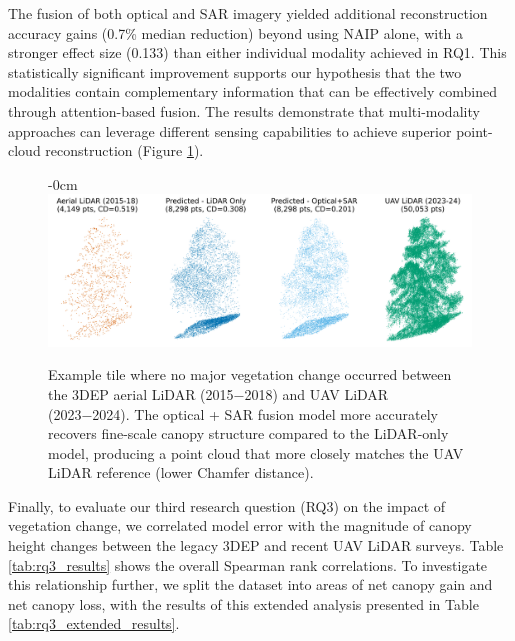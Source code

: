 \documentclass[remotesensing,article,accept,pdftex,moreauthors]{Definitions/mdpi}
\renewcommand{\hl}[1]{#1}
\begin{document}
The fusion of both optical and SAR imagery yielded additional reconstruction accuracy gains (0.7\% median reduction) beyond using NAIP alone, with a stronger effect size (0.133) than either individual modality achieved in RQ1. This statistically significant improvement supports our hypothesis that the two modalities contain complementary information that can be effectively combined through attention-based fusion. The results demonstrate that multi-modality approaches can leverage different sensing capabilities to achieve superior point-cloud reconstruction (Figure \ref{fig:model_output_example}).


\vspace{-3pt}


\begin{figure}[H]
\begin{adjustwidth}{-\extralength}{0cm}
\centering
    \includegraphics[width=1\linewidth]{figures/model_output_example.png}
    \end{adjustwidth}
    \caption{\hl{Example} %
 tile where no major vegetation change occurred between the 3DEP aerial LiDAR (2015−2018) and UAV LiDAR (2023−2024). The optical + SAR fusion model more accurately recovers fine-scale canopy structure compared to the LiDAR-only model, producing a point cloud that more closely matches the UAV LiDAR reference (lower Chamfer distance).}
    \label{fig:model_output_example}
\end{figure}




Finally, to evaluate our third research question (RQ3) on the impact of vegetation change, we correlated model error with the magnitude of canopy height changes between the legacy 3DEP and recent UAV LiDAR surveys. Table \ref{tab:rq3_results} shows the overall Spearman rank correlations. To investigate this relationship further, we split the dataset into areas of net canopy gain and net canopy loss, with the results of this extended analysis presented in Table \ref{tab:rq3_extended_results}.
\end{document}
